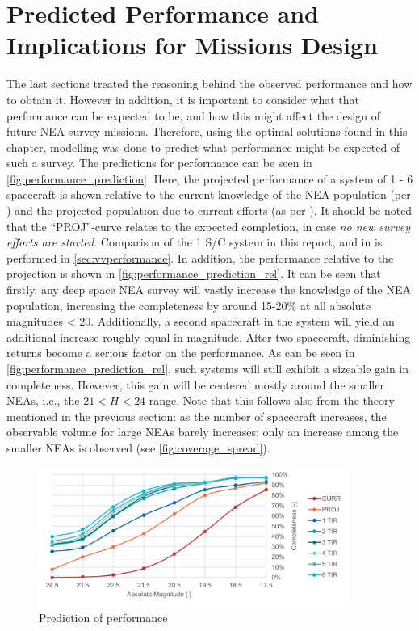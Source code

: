\section{Predicted Performance and Implications for Missions Design}
\label{sec:results_performance}
The last sections treated the reasoning behind the observed performance and how to obtain it. However in addition, it is important to consider what that performance can be expected to be, and how this might affect the design of future NEA survey missions. Therefore, using the optimal solutions found in this chapter, modelling was done to predict what performance might be expected of such a survey. The predictions for performance can be seen in \autoref{fig:performance_prediction}. Here, the projected performance of a system of 1 - 6 spacecraft is shown relative to the current knowledge of the NEA population (per \cite{HarrisPopulation}) and the projected population due to current efforts (as per \cite{2017NEOSDT}). It should be noted that the ``PROJ''-curve relates to the expected completion, in case \textit{no new survey efforts are started}. Comparison of the 1 S/C system in this report, and in \cite{2017NEOSDT} is performed in \autoref{sec:vvperformance}. In addition, the performance relative to the projection is shown in \autoref{fig:performance_prediction_rel}. It can be seen that firstly, any deep space NEA survey will vastly increase the knowledge of the NEA population, increasing the completeness by around 15-20\% at all absolute magnitudes < 20. Additionally, a second spacecraft in the system will yield an additional increase roughly equal in magnitude. After two spacecraft, diminishing returns become a serious factor on the performance. As can be seen in \autoref{fig:performance_prediction_rel}, such systems will still exhibit a sizeable gain in completeness. However, this gain will be centered mostly around the smaller NEAs, i.e., the $21 < H < 24$-range. Note that this follows also from the theory mentioned in the previous section: as the number of spacecraft increases, the observable volume for large NEAs barely increases; only an increase among the smaller NEAs is observed (see \autoref{fig:coverage_spread}).\\


\begin{figure}[htbp]
 \centering
 \includegraphics[width=0.9\textwidth]{img/performance_prediction.pdf}
 \caption{Prediction of performance}
 \label{fig:performance_prediction}
\end{figure}

